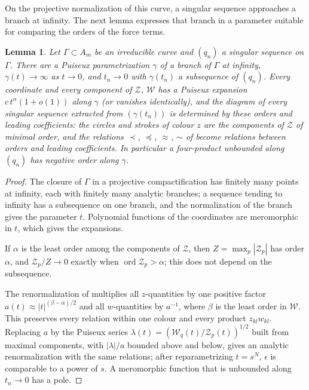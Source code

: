 \documentclass[Threeside,11pt]{article}
\newtheorem{lemma}[theorem]{Lemma}
\theoremstyle{definition}
\theoremstyle{remark}
\numberwithin{equation}{section}
\theoremstyle{remark}
\newcommand{\ord}{\operatorname{ord}}
\begin{document}
On the projective normalization of this curve, a singular sequence approaches a branch
at infinity.  The next lemma expresses that branch in a parameter suitable for comparing
the orders of the force terms.

\begin{lemma}\label{lem:germ}
Let $\Gamma\subset A_m$ be an irreducible curve and $(q_n)$ a singular sequence on $\Gamma$.  There
are a Puiseux parametrization $\gamma$ of a branch of $\Gamma$ at infinity, $\gamma(t)\to\infty$ as
$t\to 0$, and $t_n\to0$ with $\gamma(t_n)$ a subsequence of $(q_n)$.  Every coordinate and every
component of $\mathcal Z$, $\mathcal W$ has a Puiseux expansion $c\,t^{\alpha}(1+o(1))$ along
$\gamma$ (or vanishes identically), and the diagram of every singular sequence extracted from
$(\gamma(t_n))$ is determined by these orders and leading coefficients: the circles and strokes
of colour $z$ are the components of $\mathcal Z$ of minimal order, and the relations $\prec$,
$\preccurlyeq$, $\approx$, $\sim$ of \cite[\S3]{AK} become relations between orders and leading
coefficients.  In particular a four-product unbounded along $(q_n)$ has negative order along
$\gamma$.
\end{lemma}

\begin{proof}
The closure of $\Gamma$ in a projective compactification has finitely many points at infinity,
each with finitely many analytic branches; a sequence tending to infinity has a subsequence on
one branch, and the normalization of the branch gives the parameter $t$.  Polynomial functions
of the coordinates are meromorphic in $t$, which gives the expansions.

If $\alpha$ is the least
order among the components of $\mathcal Z$, then $Z=\max_p|\mathcal Z_p|$ has order $\alpha$, and
$\mathcal Z_p/Z\to0$ exactly when $\ord\mathcal Z_p>\alpha$; this does not depend on the
subsequence.

The renormalization of \cite[p.~547]{AK} multiplies all $z$-quantities by one
positive factor $a(t)\approx|t|^{(\beta-\alpha)/2}$ and all $w$-quantities by $a^{-1}$, where
$\beta$ is the least order in $\mathcal W$.  This preserves every relation within one colour and
every product $z_{kl}w_{kl}$.  Replacing $a$ by the Puiseux series $\lambda(t)=(\mathcal W_q(t)/
\mathcal Z_p(t))^{1/2}$ built from maximal components, with $|\lambda|/a$ bounded above and
below, gives an analytic renormalization with the same relations; after reparametrizing
$t=s^N$, $\epsilon$ is comparable to a power of $s$.  A meromorphic function that is unbounded
along $t_n\to0$ has a pole.
\end{proof}
\end{document}
